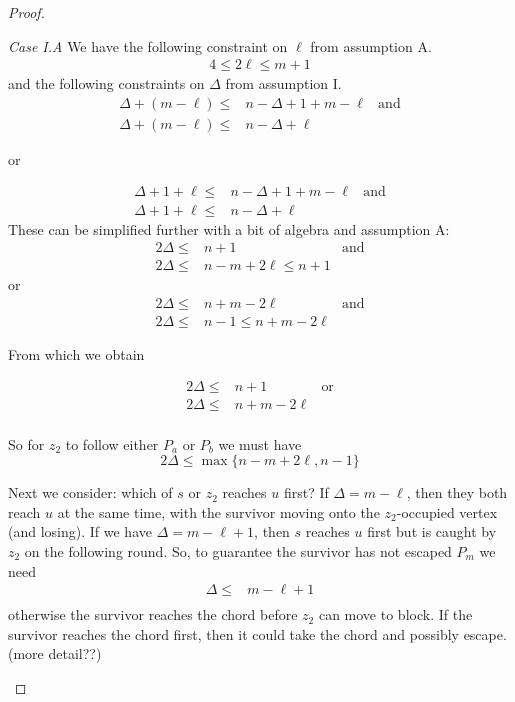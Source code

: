 \documentclass[letterpaper, 10pt]{article}
\begin{document}
\begin{proof}
\begin{proofpart}
\textit{Case I.A} We have the following constraint on $\ell$ from
assumption A.
\begin{align*}
  4 \leq 2 \ell \leq m + 1
\end{align*}
and the following constraints on $\Delta$ from assumption I.
\begin{align*}
  \Delta + (m - \ell) \leq & n - \Delta + 1 + m - \ell & \text{and}\\
 \Delta + (m - \ell) \leq & n - \Delta + \ell
\end{align*}
\begin{center}or\end{center}
\begin{align*}
\Delta + 1 + \ell \leq &n - \Delta + 1 + m - \ell & \text{and} \\
 \Delta + 1 + \ell \leq & n - \Delta + \ell
\end{align*}
These can be simplified further with a bit of algebra and  assumption A:
\begin{align*}
2 \Delta \leq & n+1 & \text{and} \\
2 \Delta \leq & n - m + 2\ell \leq n+1
\end{align*}
or
\begin{align*}
2 \Delta \leq & n+m -2 \ell & \text{and} \\
2 \Delta \leq & n -1 \leq n + m - 2\ell
\end{align*}

From which we obtain

\begin{align*}
2 \Delta \leq & n+1 & \text{or} \\
2 \Delta \leq & n+m -2 \ell \\
\end{align*}

So for $z_2$ to follow either $P_a$ or $P_b$ we must have
\[ 2 \Delta \leq \max \{ n - m +2\ell, n -1 \} \]

Next we consider: which of $s$ or $z_2$ reaches $u$ first?
If $\Delta = m - \ell$, then they both reach $u$ at the same time, with the survivor moving onto the $z_2$-occupied vertex (and losing).
If we have $\Delta = m - \ell + 1$, then $s$ reaches $u$ first
but is caught by $z_2$ on the following round.
So, to guarantee the survivor has not escaped $P_m$ we need
\begin{align*}
  \Delta \leq & m- \ell + 1\\
\end{align*}
otherwise the survivor reaches the chord before $z_2$ can move
to block. If the survivor reaches the chord first, then it could
take the chord and possibly escape. (more detail??)


\end{proofpart}
\end{proof}
\end{document}
